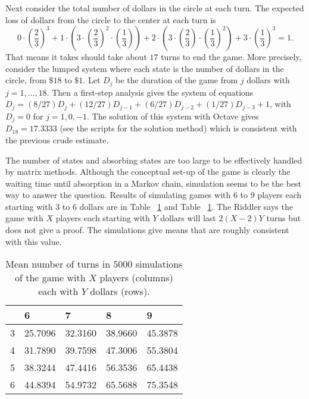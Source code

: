 \documentclass[12pt]{article}
\begin{document}
\begin{example}
    Next consider the total number of dollars in the circle at each
    turn.  The expected loss of dollars from the circle to the center at
    each turn is
    \[
        0 \cdot \left( \frac{2}{3} \right)^3 + 1 \cdot \left( 3 \cdot
        \left( \frac{2}{3} \right)^2 \cdot \left( \frac{1}{3} \right)
        \right) + 2 \cdot \left( 3 \cdot \left( \frac{2}{3} \right)
        \cdot \left( \frac{1}{3} \right)^2 \right) + 3 \cdot \left(
        \frac {1}{3} \right)^3 = 1.
    \] That means it takes should take about \( 17 \) turns to end the
    game.  More precisely, consider the lumped system where each state
    is the number of dollars in the circle, from \( \$18 \) to \( \$1 \).
    Let \( D_j \) be the duration of the game from \( j \) dollars with \(
    j = 1, \dots, 18 \).  Then a first-step analysis gives the system of
    equations \( D_j = (8/27)D_j + (12/27)D_{j-1} + (6/27)D_{j-2} + (1/27)D_
    {j-3} + 1 \), with \( D_j = 0 \) for \( j = 1, 0, -1 \).  The
    solution of this system with Octave gives \( D_{18} = 17.3333 \) (see
    the scripts for the solution method) which is consistent with the
    previous crude estimate.

    The number of states and absorbing states are too large to be
    effectively handled by matrix methods.  Although the conceptual
    set-up of the game is clearly the waiting time until absorption in a
    Markov chain, simulation seems to be the best way to answer the
    question.  Results of simulating games with \( 6 \) to \( 9 \)
    players each starting with \( 3 \) to \( 6 \) dollars are in Table~%
    \ref{tab:waitingtimeabsorption:lcrmean} and Table~%
    \ref{tab:waitingtimeabsorption:lcrmean}. The Riddler says the game
    with \( X \) players each starting with \( Y \) dollars will last \(
    2(X-2)Y \) turns but does not give a proof.  The simulations give
    means that are roughly consistent with this value.
    \begin{table}
        \centering
        \begin{tabular}{l | llll}
                   & 6       & 7       & 8       & 9       \\ 
            \hline
            3      & 25.7096 & 32.3160 & 38.9660 & 45.3878 \\ 
            4      & 31.7890 & 39.7598 & 47.3006 & 55.3804 \\ 
            5      & 38.3244 & 47.4416 & 56.3536 & 65.4438 \\ 
            6      & 44.8394 & 54.9732 & 65.5688 & 75.3548
        \end{tabular}
        \caption{Mean number of turns in \( 5000 \) simulations of the
        game with \( X \) players (columns) each with \( Y \) dollars (rows).}
        \label{tab:waitingtimeabsorption:lcrmean}
    \end{table}


\end{example}
\end{document}
